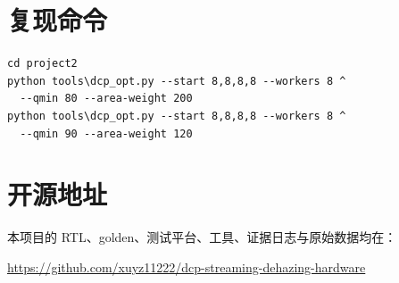 \documentclass[UTF8,11pt,a4paper,fontset=windows]{ctexart}
\begin{document}
\section{复现命令}

\begin{verbatim}
cd project2
python tools\dcp_opt.py --start 8,8,8,8 --workers 8 ^
  --qmin 80 --area-weight 200
python tools\dcp_opt.py --start 8,8,8,8 --workers 8 ^
  --qmin 90 --area-weight 120
\end{verbatim}

\section{开源地址}

本项目的 RTL、golden、测试平台、工具、证据日志与原始数据均在：

\begin{center}
\url{https://github.com/xuyz11222/dcp-streaming-dehazing-hardware}
\end{center}
\end{document}

